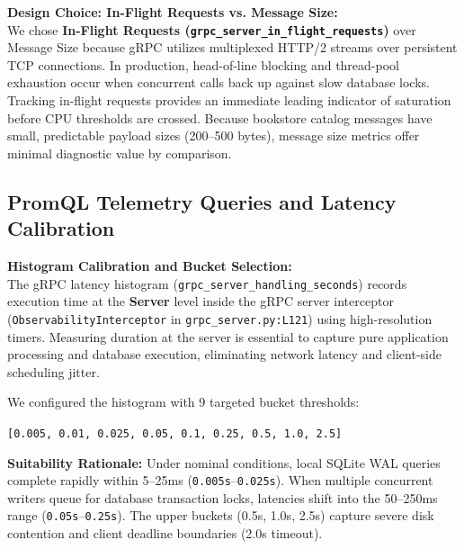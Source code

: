 \documentclass[11pt,a4paper]{article}
\begin{document}
\noindent\textbf{Design Choice: In-Flight Requests vs. Message Size:}\\
We chose \textbf{In-Flight Requests (\texttt{grpc\_server\_in\_flight\_requests})} over Message Size because gRPC utilizes multiplexed HTTP/2 streams over persistent TCP connections. In production, head-of-line blocking and thread-pool exhaustion occur when concurrent calls back up against slow database locks. Tracking in-flight requests provides an immediate leading indicator of saturation before CPU thresholds are crossed. Because bookstore catalog messages have small, predictable payload sizes (200--500 bytes), message size metrics offer minimal diagnostic value by comparison.

\subsection{PromQL Telemetry Queries and Latency Calibration}
\textbf{Histogram Calibration and Bucket Selection:}\\
The gRPC latency histogram (\texttt{grpc\_server\_handling\_seconds}) records execution time at the \textbf{Server} level inside the gRPC server interceptor (\texttt{ObservabilityInterceptor} in \texttt{grpc\_server.py:L121}) using high-resolution timers. Measuring duration at the server is essential to capture pure application processing and database execution, eliminating network latency and client-side scheduling jitter.

We configured the histogram with 9 targeted bucket thresholds:
\begin{center}
\texttt{[0.005, 0.01, 0.025, 0.05, 0.1, 0.25, 0.5, 1.0, 2.5]} 
\end{center}
\textbf{Suitability Rationale:} Under nominal conditions, local SQLite WAL queries complete rapidly within 5--25ms (\texttt{0.005s}--\texttt{0.025s}). When multiple concurrent writers queue for database transaction locks, latencies shift into the 50--250ms range (\texttt{0.05s}--\texttt{0.25s}). The upper buckets (0.5s, 1.0s, 2.5s) capture severe disk contention and client deadline boundaries (2.0s timeout).
\end{document}

